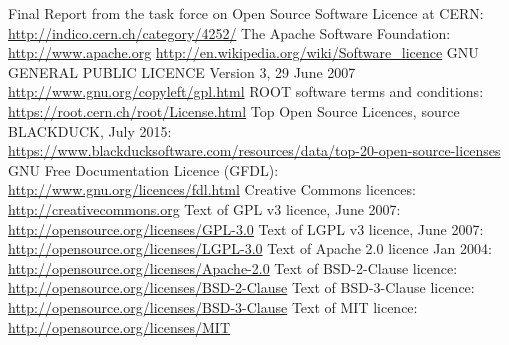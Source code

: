\documentclass[12pt,a4paper]{article}
\begin{document}
\begin{thebibliography}{9}
\bibitem{[1]} Final Report from the task force on Open Source Software Licence at CERN: \url{http://indico.cern.ch/category/4252/}
\bibitem{[2]} The Apache Software Foundation: \url{http://www.apache.org}
\bibitem{[3]} \url{http://en.wikipedia.org/wiki/Software_licence}
\bibitem{[4]} GNU GENERAL PUBLIC LICENCE Version 3, 29 June 2007 \url{http://www.gnu.org/copyleft/gpl.html}
\bibitem{[5]} ROOT software terms and conditions: \url{https://root.cern.ch/root/License.html}
\bibitem{[6]} Top Open Source Licences, source BLACKDUCK, July 2015: \url{https://www.blackducksoftware.com/resources/data/top-20-open-source-licenses}
\bibitem{[7]} GNU Free Documentation Licence (GFDL): \url{http://www.gnu.org/licences/fdl.html}
\bibitem{[8]} Creative Commons licences: \url{http://creativecommons.org}
\bibitem{[9]} Text of GPL v3 licence, June 2007: \url{http://opensource.org/licenses/GPL-3.0} 
\bibitem{[10]} Text of LGPL v3 licence, June 2007: \url{http://opensource.org/licenses/LGPL-3.0}
\bibitem{[11]} Text of Apache 2.0 licence Jan 2004: \url{http://opensource.org/licenses/Apache-2.0}
\bibitem{[12]} Text of BSD-2-Clause licence: \url{http://opensource.org/licenses/BSD-2-Clause}
\bibitem{[13]} Text of BSD-3-Clause licence: \url{http://opensource.org/licenses/BSD-3-Clause}
\bibitem{[14]} Text of MIT licence: \url{http://opensource.org/licenses/MIT}
\end{thebibliography}

\end{document}
